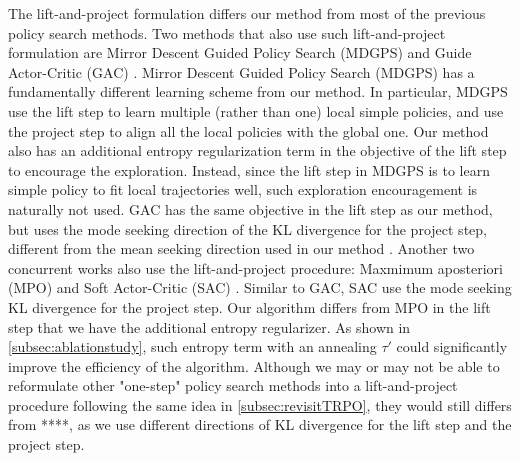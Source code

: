 The lift-and-project formulation differs our method from most of the previous policy search methods. 
Two methods that also use such lift-and-project formulation are Mirror Descent Guided Policy Search (MDGPS) and Guide Actor-Critic (GAC) \citet{montgomery2016guided,tangkaratt2017guide}.
Mirror Descent Guided Policy Search (MDGPS) has a fundamentally different learning scheme from our method. In particular, MDGPS use the lift step to learn multiple (rather than one) local simple policies, and use the project step to align all the local policies with the global one.
Our method also has an additional entropy regularization term in the objective of the lift step to encourage the exploration. Instead, since the lift step in MDGPS is to learn simple policy to fit local trajectories well, such exploration encouragement is naturally not used. 
GAC has the same objective in the lift step as our method, but 
uses the mode seeking direction of the KL divergence for the project step, different from the mean seeking direction used in our method \citep{tangkaratt2017guide}.  
Another two concurrent works also use the lift-and-project procedure: Maxmimum aposteriori (MPO) and Soft Actor-Critic (SAC) \citep{abdolmaleki2018maximum,haarnoja2018soft}. 
Similar to GAC, SAC use the mode seeking KL divergence for the project step. 
Our algorithm differs from MPO in the lift step that we have the additional entropy regularizer. 
As shown in \cref{subsec:ablationstudy}, such entropy term with an annealing $\tau'$ could significantly improve the efficiency of the algorithm.
Although we may or may not be able to reformulate other "one-step" policy search methods into a lift-and-project procedure following the same idea in \cref{subsec:revisitTRPO},
they would still differs from ****, as we use different directions of KL divergence for the lift step and the project step. 


